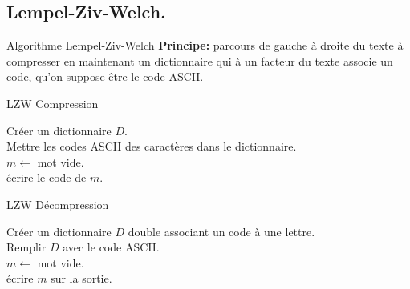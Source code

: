 \documentclass[french, 11pt]{article}
\begin{document}
\subsection{Lempel-Ziv-Welch.}
\begin{defi}{Algorithme Lempel-Ziv-Welch}{}
    \textbf{Principe:} parcours de gauche à droite du texte à compresser en maintenant un dictionnaire qui à un facteur du texte associe un code, qu'on suppose être le code ASCII.\n
    \begin{algorithm}[H]
        \caption{LZW Compression}
        Créer un dictionnaire $D$.\\
        Mettre les codes ASCII des caractères dans le dictionnaire.\\
        $m \gets$ mot vide.\\
        écrire le code de $m$.
    \end{algorithm}\vspace{0.2cm}
    \begin{algorithm}[H]
        \caption{LZW Décompression}
        Créer un dictionnaire $D$ double associant un code à une lettre.\\
        Remplir $D$ avec le code ASCII.\\
        $m \gets$ mot vide.\\
        écrire $m$ sur la sortie.
    \end{algorithm}
\end{defi}
\end{document}

